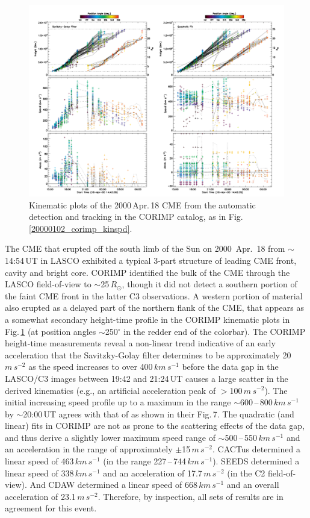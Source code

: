 \documentclass[referee,a4paper,12pt,traditabstract]{swsc}
\begin{document}
\begin{linenumbers}
\begin{figure}[t]
\centerline{\includegraphics[width=\linewidth]{images/20000418_corimp_kinspd.pdf}}
\caption{Kinematic plots of the 2000\,Apr.\,18 CME from the automatic detection and tracking in the CORIMP catalog, as in Fig.\,\ref{20000102_corimp_kinspd}.}
\label{20000418_corimp_kinspd}
\end{figure}

The CME that erupted off the south limb of the Sun on 2000~Apr.~18 from $\sim$14:54\,UT in LASCO exhibited a typical 3-part structure of leading CME front, cavity and bright core. CORIMP identified the bulk of the CME through the LASCO field-of-view to $\sim$25\,$R_\odot$, though it did not detect a southern portion of the faint CME front in the latter C3 observations. A western portion of material also erupted as a delayed part of the northern flank of the CME, that appears as a somewhat secondary height-time profile in the CORIMP kinematic plots in Fig.\,\ref{20000418_corimp_kinspd} (at position angles $\sim$250$^{\circ}$ in the redder end of the colorbar). The CORIMP height-time measurements reveal a non-linear trend indicative of an early acceleration that the Savitzky-Golay filter determines to be approximately 20\,$m\,s^{-2}$ as the speed increases to over 400\,$km\,s^{-1}$ before the data gap in the LASCO/C3 images between 19:42 and 21:24\,UT causes a large scatter in the derived kinematics (e.g., an artificial acceleration peak of $>$100\,$m\,s^{-2}$). The initial increasing speed profile up to a maximum in the range $\sim$600\,--\,800\,$km\,s^{-1}$ by $\sim$20:00\,UT agrees with that of \cite{2009A&A...495..325B} as shown in their Fig.\,7. The quadratic (and linear) fits in CORIMP are not as prone to the scattering effects of the data gap, and thus derive a slightly lower maximum speed range of $\sim$500\,--\,550\,$km\,s^{-1}$ and an acceleration in the range of approximately $\pm$15\,$m\,s^{-2}$. CACTus determined a linear speed of 463$\,km\,s^{-1}$ (in the range 227\,--\,744\,$km\,s^{-1}$). SEEDS determined a linear speed of 338$\,km\,s^{-1}$ and an acceleration of 17.7\,$m\,s^{-2}$ (in the C2 field-of-view). And CDAW determined a linear speed of 668$\,km\,s^{-1}$ and an overall acceleration of 23.1\,$m\,s^{-2}$. Therefore, by inspection, all sets of results are in agreement for this event.



\end{linenumbers}
\end{document}

